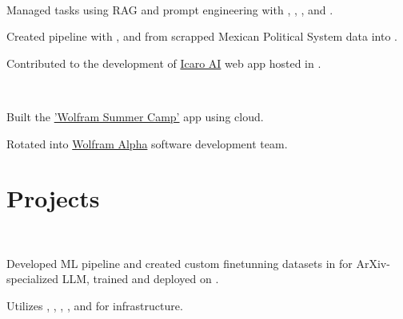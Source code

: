 \documentclass[]{tex/deedy-resume-openfont}
\begin{document}
\begin{minipage}[t]{0.66\textwidth}
\\
\begin{tightemize}
    \item Managed  tasks using RAG and prompt engineering with , , , and .
    \item Created  pipeline with ,  and  from scrapped Mexican Political System data into .
    \item Contributed to the  development of \href{http://www.icaro.ai/home/}{Icaro AI} web app hosted in .
\end{tightemize}
\sectionsep

\\
\begin{tightemize}
    \item Built the \href{https://education.wolfram.com/summer-camp/}{'Wolfram Summer Camp'} app using \href{https://www.wolfram.com/wolfram-one/}{} cloud.
    \item Rotated into \href{https://www.wolframalpha.com/}{Wolfram Alpha} software development team. 
\end{tightemize}
\sectionsep


\section{Projects}

\\
\begin{tightemize}
    \item Developed ML pipeline and created custom finetunning datasets in  for ArXiv-specialized LLM, trained and deployed on .
    \item Utilizes , , , ,  and  for infrastructure.
\end{tightemize}
\sectionsep


\end{minipage}
\end{document}
